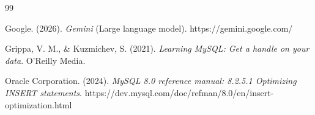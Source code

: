 \documentclass[10pt,a4paper]{article}
\begin{document}
\renewcommand{\refname}{Referencias} %
\begin{thebibliography}{99}

Google. (2026). \textit{Gemini} (Large language model). https://gemini.google.com/

Grippa, V. M., \& Kuzmichev, S. (2021). \textit{Learning MySQL: Get a handle on your data}. O'Reilly Media.

Oracle Corporation. (2024). \textit{MySQL 8.0 reference manual: 8.2.5.1 Optimizing INSERT statements}. https://dev.mysql.com/doc/refman/8.0/en/insert-optimization.html

\end{thebibliography}
\end{document}
